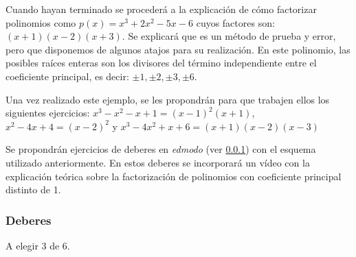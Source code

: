 Cuando hayan terminado se procederá a la explicación de cómo factorizar polinomios como $ p(x) = x^3+2x^2-5x-6$ cuyos factores son: $(x+1)(x-2)(x+3)$. 
%
Se explicará que es un método de prueba y error,  pero que disponemos de algunos atajos para su realización. 
%
En este polinomio, las posibles raíces enteras son los divisores del término independiente entre el coeficiente principal, es decir: $\pm1,\pm2,\pm3,\pm6$.

Una vez realizado este ejemplo, se les propondrán para que trabajen ellos los siguientes ejercicios: $x^3-x^2-x+1 = (x-1)^2(x+1)$, $x^2-4x+4 = (x-2)^2$ y $x^3-4x^2+x+6 = (x+1)(x-2)(x-3)$

Se propondrán ejercicios de deberes en \textit{edmodo} (ver \ref{ses6:deberes}) con el esquema utilizado anteriormente.
%
En estos deberes se incorporará un vídeo con la explicación teórica sobre la factorización de polinomios con coeficiente principal distinto de 1.


\subsubsection{Deberes}
\label{ses6:deberes}


\newbloq A elegir 3 de 6.











